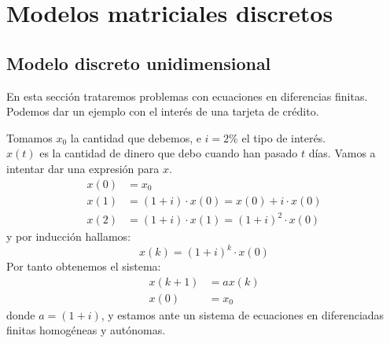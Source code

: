 
\chapter{Modelos matriciales discretos}

\section{Modelo discreto unidimensional}

En esta sección trataremos problemas con ecuaciones en diferencias finitas. Podemos dar un ejemplo con el interés de una tarjeta de crédito.

\begin{eg}
    Tomamos $x_0$ la cantidad que debemos, e $i = 2\%$ el tipo de interés.\\
    $x(t)$ es la cantidad de dinero que debo cuando han pasado $t$ días. Vamos a intentar dar una expresión para $x$.
    \begin{align*}
        x(0) &= x_0\\
        x(1) &= (1 + i)\cdot x(0) = x(0) + i \cdot x(0)\\
        x(2) &= (1+i) \cdot x(1) = (1+i)^2\cdot x(0)
    \end{align*}
    y por inducción hallamos:
    $$
        x(k) = (1+i)^{k} \cdot x(0)
    $$
    Por tanto obtenemos el sistema:
    \begin{align*}
        x(k+1) &= ax(k)\\
        x(0) &= x_0
    \end{align*}
    donde $a = (1+i)$, y estamos ante un sistema de ecuaciones en diferenciadas finitas homogéneas y autónomas.
\end{eg}
